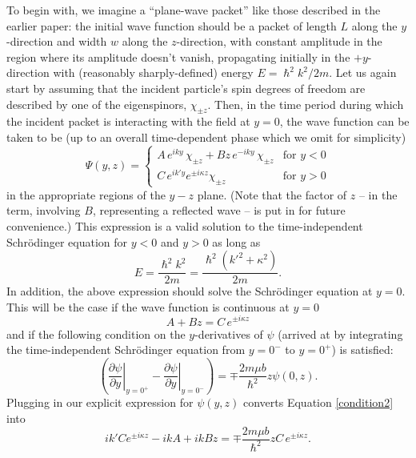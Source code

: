 \documentclass[aps,prc,onecolumn,letterpaper,floatfix,12pt]{revtex4}
\renewcommand{\hbar}{\hslash}
\begin{document}
To begin with, we imagine a ``plane-wave packet'' like those described
in the earlier paper:  the initial wave function should be a packet of
length $L$ along the $y$-direction and width $w$ along the
$z$-direction, with constant amplitude in the region where its
amplitude doesn't vanish, propagating initially in the
$+y$-direction with (reasonably sharply-defined) energy $E=
\hbar^2 k^2/2m$.  
Let us again start by
assuming that the incident particle's spin degrees of freedom are
described by one of the eigenspinors, $\chi_{\pm z}$.  Then, in the
time period during which the incident packet is interacting with the
field at $y=0$, the wave function can be taken to be (up to an overall
time-dependent phase which we omit for simplicity)
\begin{equation}
\Psi(y,z) = \left\{ \begin{array}{cc}
A \, e^{i k y} \, \chi_{\pm z} + B z\, e^{-iky} \, \chi_{\pm z} & \text{for } y < 0 \\
C \, e^{i k' y} e^{\pm i \kappa z} \chi_{\pm z} & \text{for } y > 0 
\end{array} \right. 
\label{wf}
\end{equation}
in the appropriate regions of the $y-z$ plane.  (Note that the factor of $z$ -- in the term,
involving $B$, representing a reflected wave -- is
put in for future convenience.)
This expression is a valid solution to the time-independent
Schr\"odinger equation for $y<0$ and $y>0$ as long as
\begin{equation}
E = \frac{\hbar^2 k^2}{2m} = \frac{\hbar^2 (k'^2 + \kappa^2)}{2m}.
\label{energyeq}
\end{equation}
In addition, the above expression should solve the Schr\"odinger
equation at $y=0$.  This will be the case if the wave function is
continuous at $y=0$
\begin{equation}
A + Bz = C \, e^{\pm i \kappa z}
\label{first}
\end{equation}
and if the following condition on the $y$-derivatives of $\psi$ (arrived at by
integrating the time-independent Schr\"odinger equation from $y=0^-$
to $y = 0^+$) is satisfied:
\begin{equation}
\left( \left. \frac{\partial \psi}{\partial y} \right|_{y=0^+} -
  \left. \frac{\partial \psi}{\partial y} \right|_{y=0^-} \right) =
\mp \frac{2m \mu b}{\hbar^2} z \psi(0,z).
\label{condition2}
\end{equation}
Plugging in our explicit expression for $\psi(y,z)$ converts Equation \eqref{condition2} into
\begin{equation}
i k' C e^{\pm i \kappa z} - i k A +i k B z = \mp \frac{2 m \mu
  b}{\hbar^2}z C \, e^{\pm i \kappa z}.
\label{second}
\end{equation}
\end{document}
